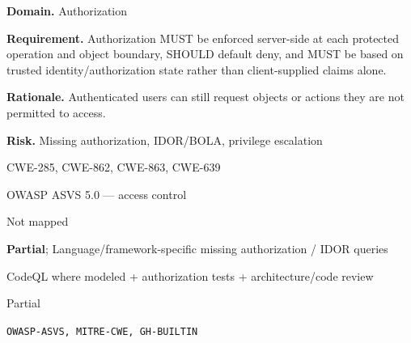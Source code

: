 \documentclass[10pt,letterpaper]{article}
\newcommand{\prioritybadge}[2]{\tcbox[on line,boxrule=0pt,arc=1.2mm,boxsep=0.7mm,left=1mm,right=1mm,top=0.4mm,bottom=0.4mm,colback=#2!12,coltext=#2]{\scriptsize\bfseries #1}}
\begin{document}
\begin{rulebox}[title={\texttt{SCS-ALL-AUTHZ-001} \hfill \prioritybadge{Critical Control}{Critical}}]
\textbf{Domain.} Authorization

\textbf{Requirement.} Authorization MUST be enforced server-side at each protected operation and object boundary, SHOULD default deny, and MUST be based on trusted identity/authorization state rather than client-supplied claims alone.

\textbf{Rationale.} Authenticated users can still request objects or actions they are not permitted to access.

\textbf{Risk.} Missing authorization, IDOR/BOLA, privilege escalation

\begin{description}[leftmargin=2.65cm,labelwidth=2.3cm,style=nextline,itemsep=1pt,topsep=3pt]
  \item[CWE] CWE-285, CWE-862, CWE-863, CWE-639
  \item[OWASP] OWASP ASVS 5.0 --- access control
  \item[CERT] Not mapped
  \item[CodeQL] \textbf{Partial}; Language/framework-specific missing authorization / IDOR queries
  \item[Enforcement] CodeQL where modeled + authorization tests + architecture/code review
  \item[Automation] Partial
  \item[Sources] \texttt{OWASP-ASVS, MITRE-CWE, GH-BUILTIN}
\end{description}
\end{rulebox}
\end{document}
